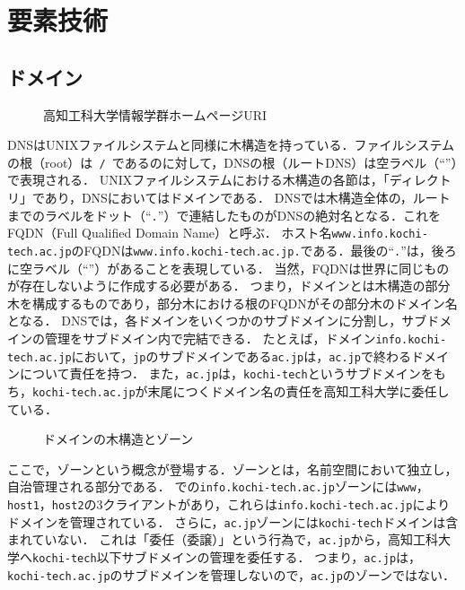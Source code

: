 \section{要素技術}
\subsection{ドメイン}\label{chap:domain}
\newcommand{\popt}{POP3}
\begin{wrapfigure}{r}[0mm]{.55\textwidth}
    \vspace{-1.5cm}
    \centering
    
    \vspace{1em}
    \caption{高知工科大学情報学群ホームページURI}
    \vspace{-.5cm}
\end{wrapfigure}
DNSはUNIXファイルシステムと同様に木構造を持っている．ファイルシステムの根（root）は\texttt{\ /\ }であるのに対して，DNSの根（ルートDNS）は空ラベル（``''）で表現される．
UNIXファイルシステムにおける木構造の各節は，「ディレクトリ」であり，DNSにおいてはドメインである．
DNSでは木構造全体の，ルートまでのラベルをドット（``\texttt{.}''）で連結したものがDNSの絶対名となる．これをFQDN（Full Qualified Domain Name）と呼ぶ．
ホスト名\texttt{www.info.kochi-tech.ac.jp}のFQDNは\texttt{www.info.kochi-tech.ac.jp.}である．最後の``\texttt{.}''は，後ろに空ラベル（``''）があることを表現している．
当然，FQDNは世界に同じものが存在しないように作成する必要がある．
つまり，ドメインとは木構造の部分木を構成するものであり，部分木における根のFQDNがその部分木のドメイン名となる．
DNSでは，各ドメインをいくつかのサブドメインに分割し，サブドメインの管理をサブドメイン内で完結できる．
たとえば，ドメイン\texttt{info.kochi-tech.ac.jp}において，\texttt{jp}のサブドメインである\texttt{ac.jp}は，\texttt{ac.jp}で終わるドメインについて責任を持つ．
また，\texttt{ac.jp}は，\texttt{kochi-tech}というサブドメインをもち，\texttt{kochi-tech.ac.jp}が末尾につくドメイン名の責任を高知工科大学に委任している．

\begin{wrapfigure}{r}[0mm]{.62\textwidth}
    \centering
    
    \caption{ドメインの木構造とゾーン}
    \label{fig:ドメインの木構造とゾーン}
    \vspace{-1cm}
\end{wrapfigure}
ここで，ゾーンという概念が登場する．ゾーンとは，名前空間において独立し，自治管理される部分である．
での\texttt{info.kochi-tech.ac.jp}ゾーンには\texttt{www}，\texttt{host1}，\texttt{host2}の3クライアントがあり，これらは\texttt{info.kochi-tech.ac.jp}によりドメインを管理されている．
さらに，\texttt{ac.jp}ゾーンには\texttt{kochi-tech}ドメインは含まれていない．
これは「委任（委譲）」という行為で，\texttt{ac.jp}から，高知工科大学へ\texttt{kochi-tech}以下サブドメインの管理を委任する．
つまり，\texttt{ac.jp}は，\texttt{kochi-tech.ac.jp}のサブドメインを管理しないので，\texttt{ac.jp}のゾーンではない．
\hfill\cite[p.23]{DNSBIND}
